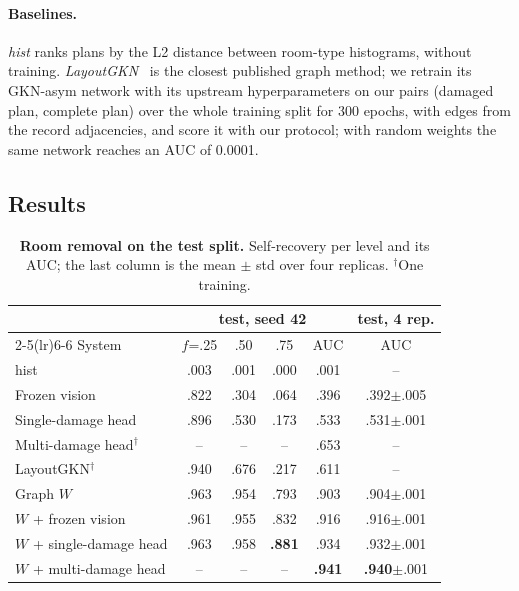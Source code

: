 \paragraph{Baselines.}
\emph{hist} ranks plans by the L2 distance between room-type histograms, without training.
\emph{LayoutGKN}~\cite{vanengelenburg2025layoutgkn} is the closest published graph method; we retrain its GKN-asym network with its upstream hyperparameters on our pairs (damaged plan, complete plan) over the whole training split for 300 epochs, with edges from the record adjacencies, and score it with our protocol; with random weights the same network reaches an AUC of 0.0001.

\subsection{Results}
\label{sec:results}


\begin{table}[t]
  \centering
  \small
  \setlength{\tabcolsep}{3.2pt}
  \begin{tabular}{@{}lccccc@{}}
    \toprule
    & \multicolumn{4}{c}{test, seed 42} & test, 4 rep. \\
    \cmidrule(lr){2-5}\cmidrule(lr){6-6}
    System & $f$=.25 & .50 & .75 & AUC & AUC \\
    \midrule
    hist & .003 & .001 & .000 & .001 & -- \\
    Frozen vision & .822 & .304 & .064 & .396 & .392{\scriptsize$\pm$.005} \\
    Single-damage head & .896 & .530 & .173 & .533 & .531{\scriptsize$\pm$.001} \\
    Multi-damage head$^\dagger$ & -- & -- & -- & .653 & -- \\
    LayoutGKN$^\dagger$ & .940 & .676 & .217 & .611 & -- \\
    Graph $W$ & .963 & .954 & .793 & .903 & .904{\scriptsize$\pm$.001} \\
    \midrule
    $W$ + frozen vision & .961 & .955 & .832 & .916 & .916{\scriptsize$\pm$.001} \\
    $W$ + single-damage head & .963 & .958 & \textbf{.881} & .934 & .932{\scriptsize$\pm$.001} \\
    $W$ + multi-damage head & -- & -- & -- & \textbf{.941} & \textbf{.940}{\scriptsize$\pm$.001} \\
    \bottomrule
  \end{tabular}
  \caption{\textbf{Room removal on the test split.}
  Self-recovery per level and its AUC; the last column is the mean $\pm$ std over four replicas.
  $^\dagger$One training.}
  \label{tab:main}
\end{table}

